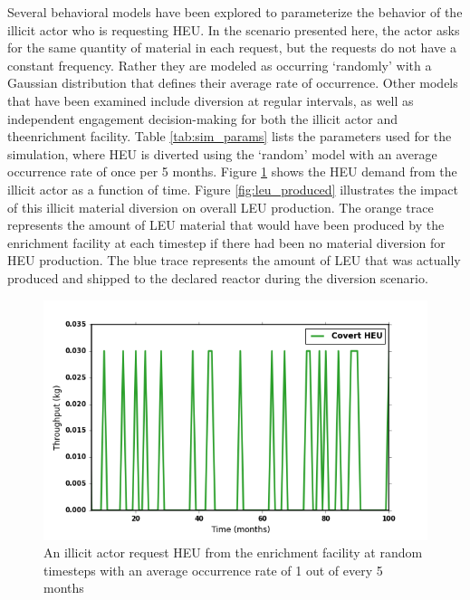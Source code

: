 Several behavioral models have been explored to parameterize the behavior of the illicit actor who is requesting \gls{HEU}.   In the scenario presented here, the actor asks for the same quantity of material in each request, but the requests do not have a constant frequency. Rather they are modeled as occurring `randomly' with a Gaussian distribution that defines their average rate of occurrence.  Other models that have been examined include diversion at regular intervals, as well as independent engagement decision-making for both the illicit actor and theenrichment facility.  Table \ref{tab:sim_params} lists the parameters used for the simulation, where \gls{HEU} is diverted using the `random' model with an average occurrence rate of once per 5 months.  Figure \ref{fig:heu_demand} shows the \gls{HEU} demand from the illicit actor as a function of time.  Figure \ref{fig:leu_produced} illustrates the impact of this illicit material diversion on overall \gls{LEU} production.  The orange trace represents the amount of \gls{LEU} material that would have been produced by the enrichment facility at each timestep if there had been no material diversion for \gls{HEU} production.  The blue trace represents the amount of \gls{LEU} that was actually produced and shipped to the declared reactor during the diversion scenario.


\begin{figure}
\begin{center}
\includegraphics[natwidth=162bp,natheight=227bp, scale=0.7]{./figs/HEU_R5.png}
\end{center}
\caption{An illicit actor request \gls{HEU} from the enrichment facility at random timesteps with an average occurrence rate of 1 out of every 5 months }
\label{fig:heu_demand}
\end{figure}

